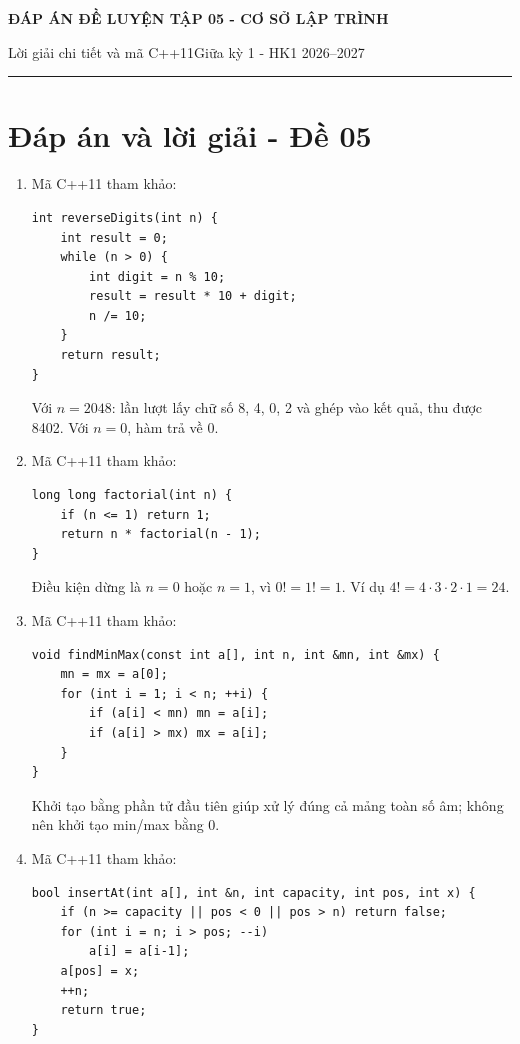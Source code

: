 \documentclass[11pt,a4paper]{article}
\newcommand{\examtitle}[4]{\begin{center}{\Large\bfseries\color{hcmusblue}#1}\par\vspace{3pt}{\large\bfseries #2}\par\vspace{3pt}\small #3\quad\textbullet\quad #4\end{center}\vspace{5pt}\hrule\vspace{8pt}}
\begin{document}
\small
\examtitle{ĐÁP ÁN ĐỀ LUYỆN TẬP 05 - CƠ SỞ LẬP TRÌNH}{CƠ SỞ LẬP TRÌNH - HCMUS (theo lịch học tuần 1--5)}{Lời giải chi tiết và mã C++11}{Giữa kỳ 1 - HK1 2026--2027}

\section*{Đáp án và lời giải - Đề 05}
\begin{enumerate}
\item \begin{minipage}[t]{\linewidth}
Mã C++11 tham khảo:
\begin{lstlisting}
int reverseDigits(int n) {
    int result = 0;
    while (n > 0) {
        int digit = n % 10;
        result = result * 10 + digit;
        n /= 10;
    }
    return result;
}
\end{lstlisting}
Với $n=2048$: lần lượt lấy chữ số 8, 4, 0, 2 và ghép vào kết quả, thu được 8402. Với $n=0$, hàm trả về 0.
\end{minipage}
\item \begin{minipage}[t]{\linewidth}
Mã C++11 tham khảo:
\begin{lstlisting}
long long factorial(int n) {
    if (n <= 1) return 1;
    return n * factorial(n - 1);
}
\end{lstlisting}
Điều kiện dừng là $n=0$ hoặc $n=1$, vì $0!=1!=1$. Ví dụ $4!=4\cdot3\cdot2\cdot1=24$.
\end{minipage}
\item \begin{minipage}[t]{\linewidth}
Mã C++11 tham khảo:
\begin{lstlisting}
void findMinMax(const int a[], int n, int &mn, int &mx) {
    mn = mx = a[0];
    for (int i = 1; i < n; ++i) {
        if (a[i] < mn) mn = a[i];
        if (a[i] > mx) mx = a[i];
    }
}
\end{lstlisting}
Khởi tạo bằng phần tử đầu tiên giúp xử lý đúng cả mảng toàn số âm; không nên khởi tạo min/max bằng 0.
\end{minipage}
\item \begin{minipage}[t]{\linewidth}
Mã C++11 tham khảo:
\begin{lstlisting}
bool insertAt(int a[], int &n, int capacity, int pos, int x) {
    if (n >= capacity || pos < 0 || pos > n) return false;
    for (int i = n; i > pos; --i)
        a[i] = a[i-1];
    a[pos] = x;
    ++n;
    return true;
}
\end{lstlisting}

\end{minipage}
\end{enumerate}
\end{document}
